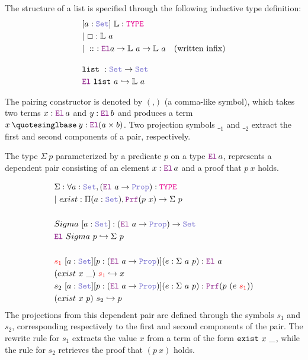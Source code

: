 \begin{definition}[List]\label{def:list}
The structure of a list is specified through the following inductive type definition:
\begin{align*}
&[a: \set]~ \bb{L}: \type \\
&|~\Box : \bb{L}~a \\
&|~\mathrel{::}~: \el  a \ra \bb{L}~a \ra \bb{L}~a \quad \text{(written infix)} \\[1em]
& \kw{list}~: \set \ra \set \\
&  \el~\kw{list}~a \re \bb{L}~a
\end{align*}
\end{definition}

The pairing constructor is denoted by $(‚)$ (a comma-like symbol), which takes two terms $x : \el\,a$ and $y : \el\, b$ and produces a term $x \mathbin{‚} y : \el (a \times b)$.
Two projection symbols ${\_}_1$ and ${\_}_2$ extract the first and second components of a pair, respectively.

\begin{definition}\label{dep-pair-def}
The type $\Sigma~p$ parameterized by a predicate $p$ on a type $\el\,a$, represents a dependent pair consisting of an element $x : \el\,a$ and a proof that $p~x$ holds.

\begin{align*}
&\Sigma : \forall a : \set{}, (\el{}~a \ra \prop): \type \\
&|~exist : \Pi (a : \set{}), \prf (p~x) \ra \Sigma~p \\
&\\
& Sigma~[a: \set{}]: (\el{}~a \ra \prop) \ra \set{} \\
& \el{}~Sigma~p \re \Sigma~p \\
&\\
& \textcolor{red}{s_1}~[a: \set{}] [p:(\el{}~a \ra \prop)] (e: \Sigma~a~p): \el{}~a \\
& (exist~x~\_)~\textcolor{red}{s_1} \re x\\
& s_2~[a: \set{}] [p:(\el{}~a \ra \prop)] (e: \Sigma~a~p): \prf{}(p~(e~\textcolor{red}{s_1})) \\
& (exist~x~p)~s_2 \re p\\
\end{align*}
The projections from this dependent pair are defined through the symbols $s_1$ and $s_2$, corresponding respectively to the first and second components of the pair.
The rewrite rule for $s_1$ extracts the value $x$ from a term of the form $\texttt{\upshape{exist}}~x~\_$, while the rule for $s_2$ retrieves the proof that $(p~x)$ holds.
\end{definition}

